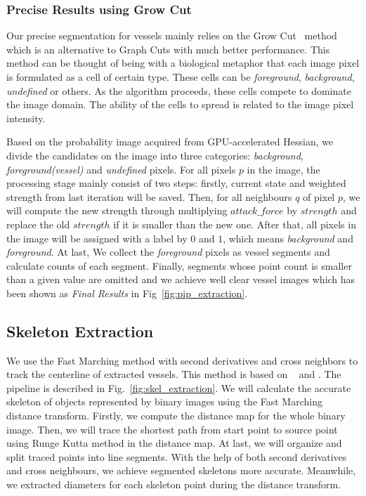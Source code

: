 \documentclass[journal]{IEEEtran}
\begin{document}
\subsubsection{\textbf{Precise Results using Grow Cut}}
\label{subsubsec:growcut}
Our precise segmentation for vessels mainly relies on the Grow Cut~\cite{vezhnevets2005growcut} method which is an alternative to Graph Cuts with much better performance. This method can be thought of being with a biological metaphor that each image pixel is formulated as a cell of certain type. These cells can be \textit{foreground}, \textit{background}, \textit{undefined} or others. As the algorithm proceeds, these cells compete to dominate the image domain. The ability of the cells to spread is related to the image pixel intensity.

Based on the probability image acquired from GPU-accelerated Hessian, we divide the candidates on the image into three categories: \textit{background}, \textit{foreground(vessel)} and \textit{undefined} pixels. For all pixels $p$ in the image, the processing stage mainly consist of two steps: firstly, current state and weighted strength from last iteration will be saved. Then, for all neighbours $q$ of pixel $p$, we will compute the new strength through multiplying $attack\_force$ by $strength$ and replace the old $strength$ if it is smaller than the new one. After that, all pixels in the image will be assigned with a label by $0$ and $1$, which means \textit{background} and \textit{foreground}. At last, We collect the \textit{foreground} pixels as vessel segments and calculate counts of each segment. Finally, segments whose point count is smaller than a given value are omitted and we achieve well clear vessel images which has been shown as \textit{Final Results} in Fig~\ref{fig:pip_extraction}.


\subsection{Skeleton Extraction}
\label{subsec:skeleton-extraction}
We use the Fast Marching method with second derivatives and cross neighbors to track the centerline of extracted vessels. This method is based on ~\cite{IMM2001-0841} and \cite{hassouna2007multistencils}. The pipeline is described in Fig.~\ref{fig:skel_extraction}. We will calculate the accurate skeleton of objects represented by binary images using the Fast Marching distance transform. Firstly, we compute the distance map for the whole binary image. Then, we will trace the shortest path from start point to source point using Runge Kutta method in the distance map. At last, we will organize and split traced points into line segments. With the help of both second derivatives and cross neighbours, we achieve segmented skeletons more accurate. Meanwhile, we extracted diameters for each skeleton point during the distance transform.
\end{document}
